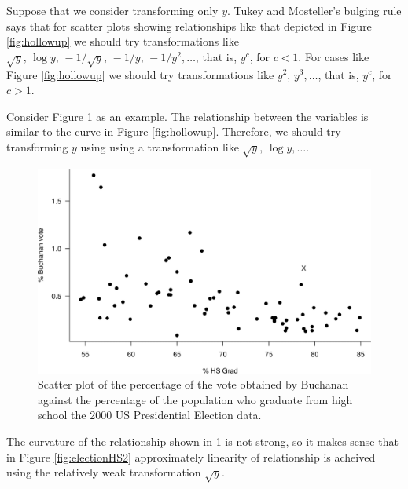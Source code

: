 \documentclass[
  11pt,
  british,
  openany, a4paper]{book}
\begin{document}
Suppose that we consider transforming only \(y\). Tukey and Mosteller's bulging rule says that for scatter plots showing relationships like that depicted in Figure \ref{fig:hollowup} we should try transformations like \(\sqrt{y}, \, \log y, \,-1/\sqrt{y}, \, -1/y, \, -1/y^2, \ldots\), that is, \(y^c\), for \(c < 1\). For cases like Figure \ref{fig:hollowup} we should try transformations like \(y^2, \, y^3, \ldots\), that is, \(y^c\), for \(c > 1\).

Consider Figure \ref{fig:electionHS1} as an example. The relationship between the variables is similar to the curve in Figure \ref{fig:hollowup}. Therefore, we should try transforming \(y\) using using a transformation like \(\sqrt{y}, \, \log y, \ldots\).

\begin{figure}

{\centering \includegraphics[width=0.75\linewidth]{images/election_HS1} 

}

\caption{Scatter plot of the percentage of the vote obtained by Buchanan against the percentage of the population who graduate from high school the 2000 US Presidential Election data.}\label{fig:electionHS1}
\end{figure}

The curvature of the relationship shown in \ref{fig:electionHS1} is not strong, so it makes sense that in Figure \ref{fig:electionHS2} approximately linearity of relationship is acheived using the relatively weak transformation \(\sqrt{y}\).
\end{document}
